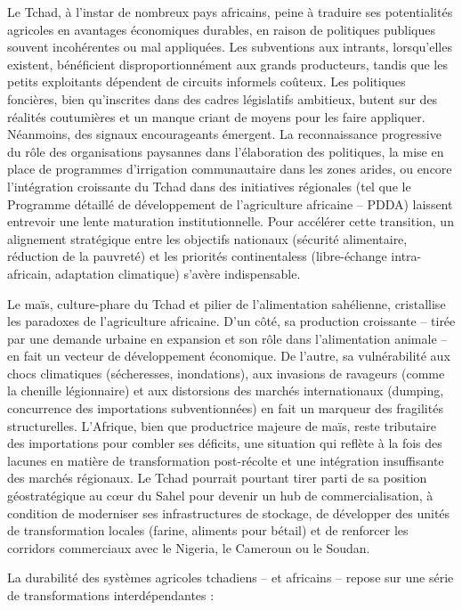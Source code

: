 \documentclass[12pt,oneside]{report}
\begin{document}
Le Tchad, à l’instar de nombreux pays africains, peine à traduire ses potentialités agricoles en avantages économiques durables, en raison de politiques publiques souvent incohérentes ou mal appliquées. Les subventions aux intrants, lorsqu’elles existent, bénéficient disproportionnément aux grands producteurs, tandis que les petits exploitants dépendent de circuits informels coûteux. Les politiques foncières, bien qu’inscrites dans des cadres législatifs ambitieux, butent sur des réalités coutumières et un manque criant de moyens pour les faire appliquer. Néanmoins, des signaux encourageants émergent. La reconnaissance progressive du rôle des organisations paysannes dans l’élaboration des politiques, la mise en place de programmes d’irrigation communautaire dans les zones arides, ou encore l’intégration croissante du Tchad dans des initiatives régionales (tel que le Programme détaillé de développement de l’agriculture africaine – PDDA) laissent entrevoir une lente maturation institutionnelle. Pour accélérer cette transition, un alignement stratégique entre les objectifs nationaux (sécurité alimentaire, réduction de la pauvreté) et les priorités continentaless (libre-échange intra-africain, adaptation climatique) s’avère indispensable.

Le maïs, culture-phare du Tchad et pilier de l’alimentation sahélienne, cristallise les paradoxes de l’agriculture africaine. D’un côté, sa production croissante – tirée par une demande urbaine en expansion et son rôle dans l’alimentation animale – en fait un vecteur de développement économique. De l’autre, sa vulnérabilité aux chocs climatiques (sécheresses, inondations), aux invasions de ravageurs (comme la chenille légionnaire) et aux distorsions des marchés internationaux (dumping, concurrence des importations subventionnées) en fait un marqueur des fragilités structurelles. L’Afrique, bien que productrice majeure de maïs, reste tributaire des importations pour combler ses déficits, une situation qui reflète à la fois des lacunes en matière de transformation post-récolte et une intégration insuffisante des marchés régionaux. Le Tchad pourrait pourtant tirer parti de sa position géostratégique au cœur du Sahel pour devenir un hub de commercialisation, à condition de moderniser ses infrastructures de stockage, de développer des unités de transformation locales (farine, aliments pour bétail) et de renforcer les corridors commerciaux avec le Nigeria, le Cameroun ou le Soudan.

La durabilité des systèmes agricoles tchadiens – et africains – repose sur une série de transformations interdépendantes :
\end{document}
